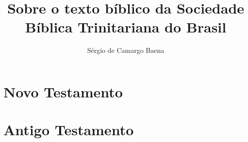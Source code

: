 \documentclass[a4paper]{scrbook}
\author{Sérgio de Camargo Baena}
\title{Sobre o texto bíblico da Sociedade Bíblica Trinitariana do Brasil}
\begin{document}
\maketitle
\tableofcontents

\part{Novo Testamento}



\part{Antigo Testamento}


\end{document}
